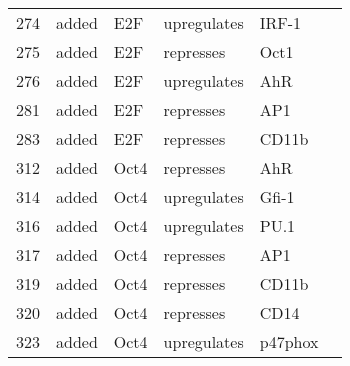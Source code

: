\begin{center}
\begin{scriptsize}
\begin{supertabular}{|p{2 cm}|p{2cm}|p{3cm}|p{2.5cm}|p{2cm}|p{1.5cm}|}
274 &  added &  E2F  & upregulates &  IRF-1 & \\
275 &  added &  E2F  & represses & Oct1 & \\
276 &  added &  E2F  & upregulates &  AhR & \\
281 &  added &  E2F  & represses & AP1 & \\
283 &  added &  E2F  & represses & CD11b & \\
312 &  added &  Oct4  & represses & AhR & \\
314 &  added &  Oct4  & upregulates &  Gfi-1 & \\
316 &  added &  Oct4  & upregulates &  PU.1 & \\
317 &  added &  Oct4  & represses & AP1 & \\
319 &  added &  Oct4  & represses & CD11b & \\
320 &  added &  Oct4  & represses & CD14 & \\
323 &  added &  Oct4  & upregulates &  p47phox & \\	

\hline
\end{supertabular}
\end{scriptsize}
\end{center}
%






